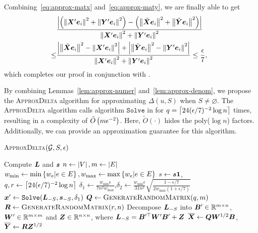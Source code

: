 \documentclass[journal]{IEEEtran}
\begin{document}
\begin{IEEEproof}
\begin{equation}
    \end{equation}
    Combining~\eqref{eq:approx-matx} and~\eqref{eq:approx-maty}, we are finally able to get
    \begin{align*}
            & \frac{\left|\left( \left\Vert\boldsymbol{X}'\boldsymbol{e}_i\right\Vert^2+\left\Vert\boldsymbol{Y}'\boldsymbol{e}_i\right\Vert^2 \right)-\left( \left\Vert\tilde{\boldsymbol{X}}\boldsymbol{e}_i\right\Vert^2+\left\Vert\tilde{\boldsymbol{Y}}\boldsymbol{e}_i\right\Vert^2 \right) \right|}{\left\Vert\boldsymbol{X}'\boldsymbol{e}_i\right\Vert^2+\left\Vert\boldsymbol{Y}'\boldsymbol{e}_i\right\Vert^2}             \\
        \le & \frac{\left|\left\Vert\tilde{\boldsymbol{X}}\boldsymbol{e}_i\right\Vert^2-\left\Vert\boldsymbol{X}'\boldsymbol{e}_i\right\Vert^2 \right|+\left|\left\Vert\tilde{\boldsymbol{Y}}\boldsymbol{e}_i\right\Vert^2-\left\Vert\boldsymbol{Y}'\boldsymbol{e}_i\right\Vert^2 \right|}{\left\Vert\boldsymbol{X}'\boldsymbol{e}_i\right\Vert^2+\left\Vert\boldsymbol{Y}'\boldsymbol{e}_i\right\Vert^2}\le\frac{\epsilon}{7},
    \end{align*}
    which completes our proof in conjunction with .
\end{IEEEproof}

By combining Lemmas~\ref{lem:approx-numer} and~\ref{lem:approx-denom}, we propose the \textsc{ApproxDelta} algorithm for approximating \(\Delta(u,S)\) when \(S\neq\varnothing\).
The \textsc{ApproxDelta} algorithm calls algorithm \(\mathtt{Solve}\) in  for \(q=\left\lceil24(\epsilon/7)^{-2}\log n\right\rceil\) times, resulting in a complexity of \(\tilde{O}\left( m\epsilon^{-2} \right)\).
Here, \(\tilde{O}(\cdot)\) hides the poly(\(\log n\)) factors.
Additionally, we can provide an approximation guarantee for this algorithm.

\begin{algorithm}
    \caption{\textsc{ApproxDelta}\((\mathcal{G},S,\epsilon)\)}
    \label{algo:approxdelta}
    Compute \(\boldsymbol{L}\) and \(\boldsymbol{s}\)\;
    \(n\gets\left|V \right|,m\gets\left|E \right|\)\;
    \(w_{\min}\gets\min\left\{w_e|e\in E \right\},w_{\max}\gets\max\left\{w_e|e\in E \right\}\)\;
    \(s\gets\boldsymbol{s}\boldsymbol{1}\),\(q,r\gets\left\lceil24(\epsilon/7)^{-2}\log n\right\rceil\)\;
    \(\delta_1\gets \frac{w_{\min}\epsilon}{7n^2w_{\max}}\),\(\delta_2\gets \frac{w_{\min}\epsilon}{31n^2}\sqrt{\frac{1-\epsilon/7}{2w_{\max}(1+\epsilon/7)}}\)\;
    \(\boldsymbol{x}'\gets\mathtt{Solve}(\boldsymbol{L}_{-S},\boldsymbol{s}_{-S},\delta_1)\)\;
    \(\boldsymbol{Q}\gets\textsc{GenerateRandomMatrix}(q,m)\)\;
    \(\boldsymbol{R}\gets\textsc{GenerateRandomMatrix}(r,n)\)\;
    Decompose \(\boldsymbol{L}_{-S}\) into \(\boldsymbol{B}'\in\mathbb{R}^{m\times n}\), \(\boldsymbol{W}'\in\mathbb{R}^{m\times m}\) and \(\boldsymbol{Z}\in\mathbb{R}^{n\times n}\), where \(\boldsymbol{L}_{-S}=\boldsymbol{B}'^\top\boldsymbol{W}'\boldsymbol{B}'+\boldsymbol{Z}\)\;
    \(\overline{\boldsymbol{X}}\gets\boldsymbol{Q}\boldsymbol{W}^{1/2}\boldsymbol{B}\),\(\overline{\boldsymbol{Y}}\gets\boldsymbol{R}\boldsymbol{Z}^{1/2}\)\;

\end{algorithm}
\end{document}
